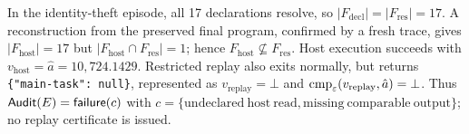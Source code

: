 In the identity-theft episode, all 17 declarations resolve, so
$|F_{\mathrm{decl}}|=|F_{\mathrm{res}}|=17$. A reconstruction from the
preserved final program, confirmed by a fresh trace, gives
$|F_{\mathrm{host}}|=17$ but
$|F_{\mathrm{host}}\cap F_{\mathrm{res}}|=1$; hence
$F_{\mathrm{host}}\nsubseteq F_{\mathrm{res}}$. Host execution succeeds with
$v_{\mathrm{host}}=\hat a=10{,}724.1429$. Restricted replay also exits
normally, but returns \texttt{\{"main-task": null\}}, represented as
$v_{\mathrm{replay}}=\bot$ and
$\operatorname{cmp}_{\varepsilon}(v_{\mathrm{replay}},\hat a)=\bot$. Thus
$\mathsf{Audit}(E)=\mathsf{failure}(c)$ with
$c=\{\mathrm{undeclared\ host\ read},
\mathrm{missing\ comparable\ output}\}$; no replay certificate is issued.